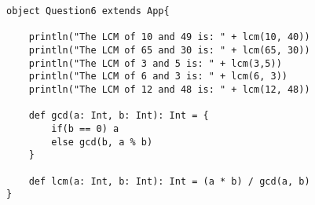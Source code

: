 \documentclass[11pt]{article}
\begin{document}
\begin{lstlisting}
object Question6 extends App{
	
	println("The LCM of 10 and 49 is: " + lcm(10, 40))
	println("The LCM of 65 and 30 is: " + lcm(65, 30))
	println("The LCM of 3 and 5 is: " + lcm(3,5))
	println("The LCM of 6 and 3 is: " + lcm(6, 3))
	println("The LCM of 12 and 48 is: " + lcm(12, 48))

	def gcd(a: Int, b: Int): Int = {
		if(b == 0) a
		else gcd(b, a % b)
	}

	def lcm(a: Int, b: Int): Int = (a * b) / gcd(a, b)
}
\end{lstlisting}
\end{document}
